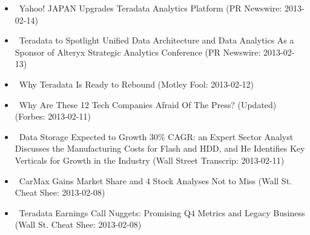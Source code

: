 \documentclass[11pt,asymmetric]{article}
\begin{document}
\begin{itemize}
\item\ Yahoo! JAPAN Upgrades Teradata Analytics Platform (PR Newswire: 2013-02-14)
\item\ Teradata to Spotlight Unified Data Architecture and Data Analytics As a Sponsor of Alteryx Strategic Analytics Conference (PR Newswire: 2013-02-13)
\item\ Why Teradata Is Ready to Rebound (Motley Fool: 2013-02-12)
\item\ Why Are These 12 Tech Companies Afraid Of The Press? (Updated) (Forbes: 2013-02-11)
\item\ Data Storage Expected to Growth 30\% CAGR: an Expert Sector Analyst Discusses the Manufacturing Costs for Flash and HDD, and He Identifies Key Verticals for Growth in the Industry (Wall Street Transcrip: 2013-02-11)
\item\ CarMax Gains Market Share and 4 Stock Analyses Not to Miss (Wall St. Cheat Shee: 2013-02-08)
\item\ Teradata Earnings Call Nuggets: Promising Q4 Metrics and Legacy Business (Wall St. Cheat Shee: 2013-02-08)
\end{itemize}
\end{document}
